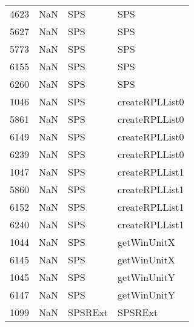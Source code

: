 \begin{tabular}{llll}
4623 &                   NaN &                        SPS &                                       SPS \\
5627 &                   NaN &                        SPS &                                       SPS \\
5773 &                   NaN &                        SPS &                                       SPS \\
6155 &                   NaN &                        SPS &                                       SPS \\
6260 &                   NaN &                        SPS &                                       SPS \\
1046 &                   NaN &                        SPS &                            createRPLList0 \\
5861 &                   NaN &                        SPS &                            createRPLList0 \\
6149 &                   NaN &                        SPS &                            createRPLList0 \\
6239 &                   NaN &                        SPS &                            createRPLList0 \\
1047 &                   NaN &                        SPS &                            createRPLList1 \\
5860 &                   NaN &                        SPS &                            createRPLList1 \\
6152 &                   NaN &                        SPS &                            createRPLList1 \\
6240 &                   NaN &                        SPS &                            createRPLList1 \\
1044 &                   NaN &                        SPS &                               getWinUnitX \\
6145 &                   NaN &                        SPS &                               getWinUnitX \\
1045 &                   NaN &                        SPS &                               getWinUnitY \\
6147 &                   NaN &                        SPS &                               getWinUnitY \\
1099 &                   NaN &                    SPSRExt &                                   SPSRExt \\

\end{tabular}
